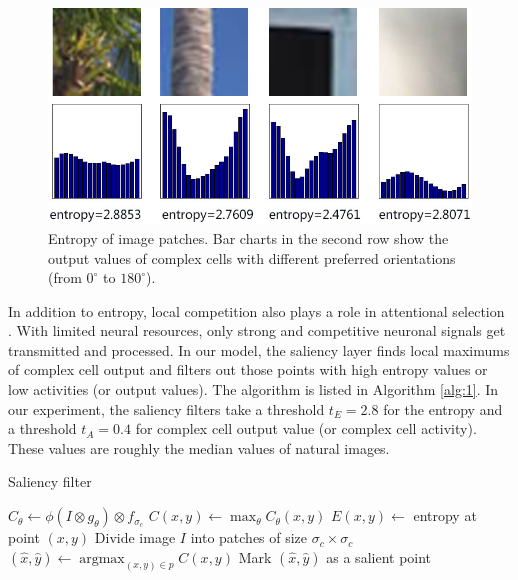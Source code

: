 \documentclass[9pt,twocolumn]{article}
\begin{document}
\begin{figure}
\centerline{\includegraphics[width=0.8\linewidth]{images/fig5.jpg}} 
\caption{Entropy of image patches.
Bar charts in the second row show the output values of complex cells
with different preferred orientations (from $0^\circ$ to $180^\circ$).}
\label{fig:5}
\end{figure}

In addition to entropy, local competition also plays a role in attentional selection \cite{desimone1995}.
With limited neural resources, only strong and competitive neuronal signals get transmitted and processed.
In our model, the saliency layer finds local maximums of complex cell output
and filters out those points with high entropy values or low activities (or output values).
The algorithm is listed in Algorithm \ref{alg:1}.
In our experiment, the saliency filters take a threshold $t_E=2.8$ for the entropy
and a threshold $t_A=0.4$ for complex cell output value (or complex cell activity).
These values are roughly the median values of natural images.

\begin{algorithm}
  \caption{Saliency filter}
  \label{alg:1}
  \begin{algorithmic}[1]
        \State $C_{\theta}\leftarrow\phi(I\otimes g_{\theta})\otimes f_{\sigma_c}$
      \EndFor
        \State $C(x,y)\leftarrow\max_{\theta}C_{\theta}(x,y)$
        \State $E(x,y)\leftarrow$ entropy at point $(x,y)$
      \EndFor
      \State Divide image $I$ into patches of size $\sigma_c\times\sigma_c$
        \State $(\hat{x},\hat{y})\leftarrow\operatorname{argmax}_{(x,y)\in p}C(x,y)$
          \State Mark $(\hat{x},\hat{y})$ as a salient point
        \EndIf
      \EndFor
    \EndProcedure
  \end{algorithmic}
\end{algorithm}
\end{document}
